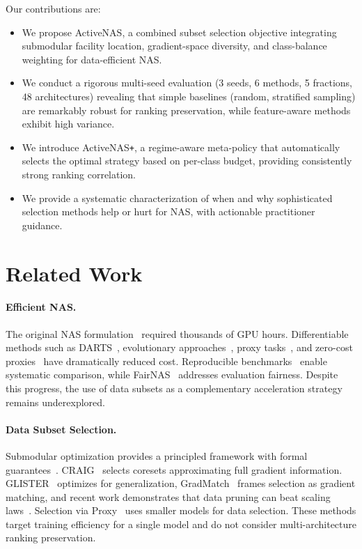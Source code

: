 \documentclass{cvpr}
\newcommand{\method}{ActiveNAS}
\newcommand{\methodplus}{ActiveNAS\texttt{+}}
\begin{document}
Our contributions are:
\begin{itemize}
    \item We propose \method{}, a combined subset selection objective integrating submodular facility location, gradient-space diversity, and class-balance weighting for data-efficient NAS.
    \item We conduct a rigorous multi-seed evaluation (3 seeds, 6 methods, 5 fractions, 48 architectures) revealing that simple baselines (random, stratified sampling) are remarkably robust for ranking preservation, while feature-aware methods exhibit high variance.
    \item We introduce \methodplus{}, a regime-aware meta-policy that automatically selects the optimal strategy based on per-class budget, providing consistently strong ranking correlation.
    \item We provide a systematic characterization of when and why sophisticated selection methods help or hurt for NAS, with actionable practitioner guidance.
\end{itemize}

\section{Related Work}
\label{sec:related}

\paragraph{Efficient NAS.}
The original NAS formulation~\cite{zoph2017neural} required thousands of GPU hours. Differentiable methods such as DARTS~\cite{liu2019darts}, evolutionary approaches~\cite{real2019regularized}, proxy tasks~\cite{zhou2020econas}, and zero-cost proxies~\cite{abdelfattah2021zerocost,mellor2021naswot,tanaka2020synflow,chen2021tenas} have dramatically reduced cost. Reproducible benchmarks~\cite{ying2019nasbench101,dong2020nasbench201,siems2020nasbench301} enable systematic comparison, while FairNAS~\cite{chu2021fairnas} addresses evaluation fairness. Despite this progress, the use of data subsets as a complementary acceleration strategy remains underexplored.

\paragraph{Data Subset Selection.}
Submodular optimization provides a principled framework with formal guarantees~\cite{wei2015submodularity,nemhauser1978analysis}. CRAIG~\cite{mirzasoleiman2020craig} selects coresets approximating full gradient information. GLISTER~\cite{killamsetty2021glister} optimizes for generalization, GradMatch~\cite{killamsetty2021gradmatch} frames selection as gradient matching, and recent work demonstrates that data pruning can beat scaling laws~\cite{sorscher2022beyond}. Selection via Proxy~\cite{coleman2020selection} uses smaller models for data selection. These methods target training efficiency for a single model and do not consider multi-architecture ranking preservation.
\end{document}
